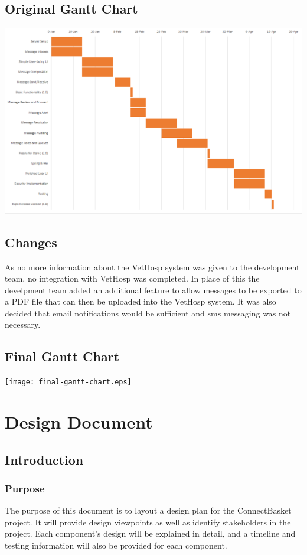 \documentclass[onecolumn, draftclsnofoot,10pt, compsoc]{IEEEtran}
\begin{document}
\subsection{Original Gantt Chart}
\includegraphics[origin=c,width=\textwidth,height=\textheight,keepaspectratio]{gantt-chart.eps}

\subsection{Changes}
As no more information about the VetHosp system was given to the development team, no integration with VetHosp was completed. In place of this the develpment team added an additional feature to allow messages to be exported to a PDF file that can then be uploaded into the VetHosp system. It was also decided that email notifications would be sufficient and sms messaging was not necessary.

\subsection{Final Gantt Chart}
\texttt{[image: final-gantt-chart.eps]}

\newpage
\section{Design Document}

\subsection{Introduction}

\subsubsection{Purpose}
The purpose of this document is to layout a design plan for the ConnectBasket project. It will provide design viewpoints as well as identify stakeholders in the project. Each component's design will be explained in detail, and a timeline and testing information will also be provided for each component.
\end{document}
